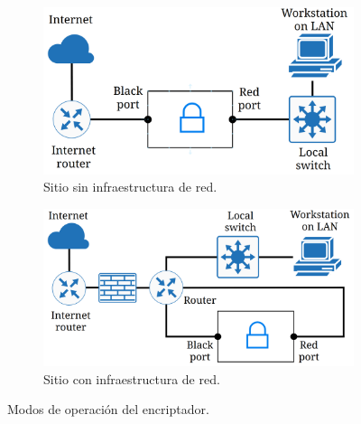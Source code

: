 \documentclass[12pt]{article}
\begin{document}
\begin{figure}[h!]
    \begin{subfigure}{0.45\textwidth}
        \centering
        \includegraphics[width=\textwidth]{images/smallmode_conops.png}
        \caption{Sitio sin infraestructura de red.}
        \label{fig:small_node}
    \end{subfigure}
    \hfill
    \begin{subfigure}{0.45\textwidth}
        \centering
        \includegraphics[width=\textwidth]{images/bigmode_conops.png}
        \caption{Sitio con infraestructura de red.}
        \label{fig:large_node}
    \end{subfigure}
    \caption{Modos de operación del encriptador.}
    \label{fig:modes_of_operation}
\end{figure}
\end{document}

